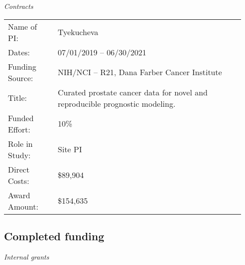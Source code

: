 \documentclass[11pt, a4paper]{article} %
\begin{document}
\emph{Contracts}
\begin{longtable}{@{}p{0.2\linewidth} p{0.75\linewidth}}
Name of PI: & Tyekucheva\\
Dates: & 07/01/2019 -- 06/30/2021\\
Funding Source: & NIH/NCI -- R21, Dana Farber Cancer Institute\\
Title: & Curated prostate cancer data for novel and reproducible prognostic modeling.\\
Funded Effort: & 10\%\\
Role in Study: & Site PI\\
Direct Costs: & \$89,904\\
Award Amount: & \$154,635\\
\end{longtable}


\subsection*{Completed funding}
\emph{Internal grants}
\end{document}
